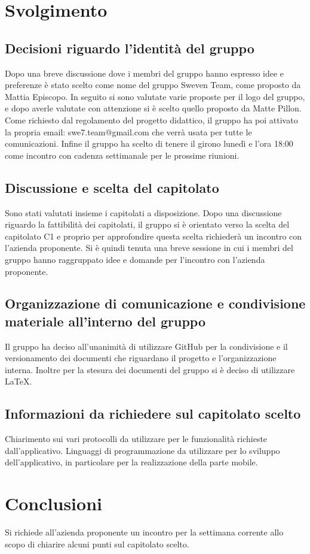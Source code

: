 \documentclass[12pt, a4paper,table]{article}
\begin{document}
	\section{Svolgimento}
		\subsection{Decisioni riguardo l'identità del gruppo}
		Dopo una breve discussione dove i membri del gruppo hanno espresso idee e preferenze è stato scelto come nome del gruppo Sweven Team, come proposto da Mattia Episcopo. In seguito si sono valutate varie proposte per il logo del gruppo, e dopo averle valutate con attenzione si è scelto quello proposto da Matte Pillon. Come richiesto dal regolamento del progetto didattico, il gruppo ha poi attivato la propria email: swe7.team@gmail.com che verrà usata per tutte le comunicazioni. Infine il gruppo ha scelto di tenere il girono lunedì e l'ora 18:00 come incontro con cadenza settimanale per le prossime riunioni.
		\subsection{Discussione e scelta del capitolato}
		Sono stati valutati insieme i capitolati a disposizione. Dopo una discussione riguardo la fattibilità dei capitolati, il gruppo si è orientato verso la scelta del capitolato C1 e proprio per approfondire questa scelta richiederà un incontro con l'azienda proponente. Si è quindi tenuta una breve sessione in cui i membri del gruppo hanno raggruppato idee e domande per l'incontro con l'azienda proponente.
		\subsection{Organizzazione di comunicazione e condivisione materiale all'interno del gruppo}
		Il gruppo ha deciso all'unanimità di utilizzare GitHub per la condivisione e il versionamento dei documenti che riguardano il progetto e l'organizzazione interna. Inoltre per la stesura dei documenti del gruppo si è deciso di utilizzare \LaTeX .
		\subsection{Informazioni da richiedere sul capitolato scelto}
		Chiarimento sui vari protocolli da utilizzare per le funzionalità richieste dall'applicativo.
		Linguaggi di programmazione da utilizzare per lo sviluppo dell'applicativo, in particolare per la realizzazione della parte mobile.
	\section{Conclusioni}
	Si richiede all'azienda proponente un incontro per la settimana corrente allo scopo di chiarire alcuni punti sul capitolato scelto.
	\newpage
\end{document}
